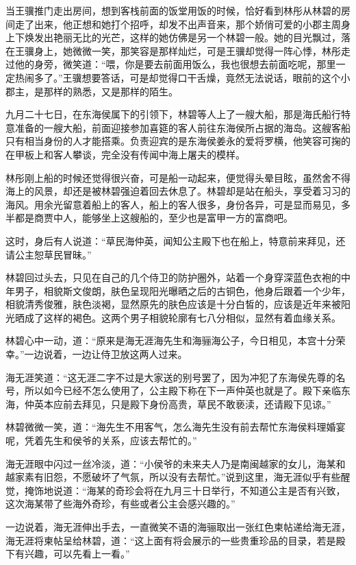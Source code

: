 当王骥推门走出房间，想到客栈前面的饭堂用饭的时候，恰好看到林彤从林碧的房间走了出来，他正想和她打个招呼，却发不出声音来，那个娇俏可爱的小郡主周身上下焕发出艳丽无比的光芒，这样的她仿佛是另一个林碧一般。她的目光飘过，落在王骥身上，她微微一笑，那笑容是那样灿烂，可是王骥却觉得一阵心悸，林彤走过他的身旁，微笑道：“喂，你是要去前面用饭么，我也很想去前面吃呢，那里一定热闹多了。”王骥想要答话，可是却觉得口干舌燥，竟然无法说话，眼前的这个小郡主，是那样的熟悉，又是那样的陌生。

九月二十七日，在东海侯属下的引领下，林碧等人上了一艘大船，那是海氏船行特意准备的一艘大船，前面迎接参加喜筵的客人前往东海侯所占据的海岛。这艘客船只有相当身份的人才能搭乘。负责迎宾的是东海侯姜永的爱将罗横，他笑容可掬的在甲板上和客人攀谈，完全没有传闻中海上屠夫的模样。

林彤刚上船的时候还觉得很兴奋，可是船一动起来，便觉得头晕目眩，虽然舍不得海上的风景，却还是被林碧强迫着回去休息了。林碧却是站在船头，享受着习习的海风。用余光留意着船上的客人，船上的客人很多，身份各异，可是显而易见，多半都是商贾中人，能够坐上这艘船的，至少也是富甲一方的富商吧。

这时，身后有人说道：“草民海仲英，闻知公主殿下也在船上，特意前来拜见，还请公主恕草民冒昧。”

林碧回过头去，只见在自己的几个侍卫的防护圈外，站着一个身穿深蓝色衣袍的中年男子，相貌斯文俊朗，肤色呈现阳光曝晒之后的古铜色，他身后跟着一个少年，相貌清秀俊雅，肤色淡褐，显然原先的肤色应该是十分白皙的，应该是近年来被阳光晒成了这样的褐色。这两个男子相貌轮廓有七八分相似，显然有着血缘关系。

林碧心中一动，道：“原来是海无涯海先生和海骊海公子，今日相见，本宫十分荣幸。”一边说着，一边让侍卫放这两人过来。

海无涯笑道：“这无涯二字不过是大家送的别号罢了，因为冲犯了东海侯先尊的名号，所以如今已经不怎么使用了，公主殿下称在下一声仲英也就是了。殿下亲临东海，仲英本应前去拜见，只是殿下身份高贵，草民不敢亵渎，还请殿下见谅。”

林碧微微一笑，道：“海先生不用客气，怎么海先生没有前去帮忙东海侯料理婚宴呢，凭着先生和侯爷的关系，应该去帮忙的。”

海无涯眼中闪过一丝冷淡，道：“小侯爷的未来夫人乃是南闽越家的女儿，海某和越家素有旧怨，不愿破坏了气氛，所以没有去帮忙。”说到这里，海无涯似乎有些醒觉，掩饰地说道：“海某的奇珍会将在九月三十日举行，不知道公主是否有兴致，这次海某带了些海外奇珍，有些或者公主会感兴趣的。”

一边说着，海无涯伸出手去，一直微笑不语的海骊取出一张红色柬帖递给海无涯，海无涯将柬帖呈给林碧，道：“这上面有将会展示的一些贵重珍品的目录，若是殿下有兴趣，可以先看上一看。”


